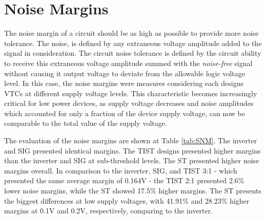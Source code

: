 \documentclass[diss,pgmicro,english]{iiufrgs}
\begin{document}

\section{Noise Margins}

	The noise margin of a circuit should be as high as possible to provide more noise tolerance. The noise, is defined by any extraneous voltage amplitude added to the signal in consideration. The circuit noise tolerance is defined by the circuit ability to receive this extraneous voltage amplitude summed with the \textit{noise-free} signal without causing it output voltage to deviate from the allowable logic voltage level. In this case, the noise margins were measures considering each designs VTCs at different supply voltage levels. This characteristic becomes increasingly critical for low power devices, as supply voltage decreases and noise amplitudes which accounted for only a fraction of the device supply voltage, can now be comparable to the total value of the supply voltage.

	The evaluation of the noise margins are shown at Table \ref{tab:SNM}. The inverter and SIG presented identical margins. The TIST designs presented higher margins than the inverter and SIG at sub-threshold levels. The ST presented higher noise margins overall. In comparison to the inverter, SIG, and TIST 3:1 - which presented the same average margin of 0.164V - the TIST 2:1 presented 2.6\% lower noise margins, while the ST showed 17.5\% higher margins. The ST presents the biggest differences at low supply voltages, with 41.91\% and 28.23\% higher margins at 0.1V and 0.2V, respectively, comparing to the inverter.
\end{document}
